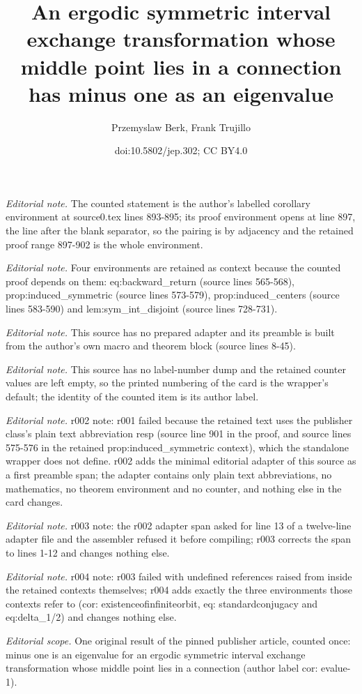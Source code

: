 \documentclass[10pt,a4paper]{article}
\title{An ergodic symmetric interval exchange transformation whose middle point lies in a connection has minus one as an eigenvalue}
\author{Przemyslaw Berk, Frank Trujillo}
\date{doi:10.5802/jep.302; CC BY4.0}
\theoremstyle{plain}
\theoremstyle{definition}
\begin{document}
\maketitle
\noindent\textit{Editorial note.} The counted statement is the author's labelled corollary environment at source0.tex lines 893-895; its proof environment opens at line 897, the line after the blank separator, so the pairing is by adjacency and the retained proof range 897-902 is the whole environment.\par\medskip
\noindent\textit{Editorial note.} Four environments are retained as context because the counted proof depends on them: eq:backward\_return (source lines 565-568), prop:induced\_symmetric (source lines 573-579), prop:induced\_centers (source lines 583-590) and lem:sym\_int\_disjoint (source lines 728-731).\par\medskip
\noindent\textit{Editorial note.} This source has no prepared adapter and its preamble is built from the author's own macro and theorem block (source lines 8-45).\par\medskip
\noindent\textit{Editorial note.} This source has no label-number dump and the retained counter values are left empty, so the printed numbering of the card is the wrapper's default; the identity of the counted item is its author label.\par\medskip
\noindent\textit{Editorial note.} r002 note: r001 failed because the retained text uses the publisher class's plain text abbreviation resp (source line 901 in the proof, and source lines 575-576 in the retained prop:induced\_symmetric context), which the standalone wrapper does not define. r002 adds the minimal editorial adapter of this source as a first preamble span; the adapter contains only plain text abbreviations, no mathematics, no theorem environment and no counter, and nothing else in the card changes.\par\medskip
\noindent\textit{Editorial note.} r003 note: the r002 adapter span asked for line 13 of a twelve-line adapter file and the assembler refused it before compiling; r003 corrects the span to lines 1-12 and changes nothing else.\par\medskip
\noindent\textit{Editorial note.} r004 note: r003 failed with undefined references raised from inside the retained contexts themselves; r004 adds exactly the three environments those contexts refer to (cor: existenceofinfiniteorbit, eq: standardconjugacy and eq:delta\_1/2) and changes nothing else.\par\medskip
\noindent\textit{Editorial scope.} One original result of the pinned publisher article, counted once: minus one is an eigenvalue for an ergodic symmetric interval exchange transformation whose middle point lies in a connection (author label cor: evalue-1).\par\medskip
\end{document}
